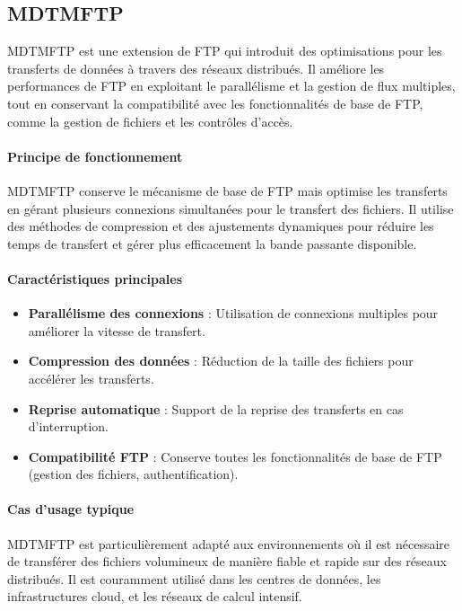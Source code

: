 \subsection{MDTMFTP}
MDTMFTP\cite{zhang2018mdtmftp, nadig2018comparative} est une extension de FTP qui introduit des optimisations pour les transferts de données à travers des réseaux distribués. Il améliore les performances de FTP en exploitant le parallélisme et la gestion de flux multiples, tout en conservant la compatibilité avec les fonctionnalités de base de FTP, comme la gestion de fichiers et les contrôles d'accès.

\paragraph{Principe de fonctionnement}
MDTMFTP conserve le mécanisme de base de FTP mais optimise les transferts en gérant plusieurs connexions simultanées pour le transfert des fichiers. Il utilise des méthodes de compression et des ajustements dynamiques pour réduire les temps de transfert et gérer plus efficacement la bande passante disponible.

\paragraph{Caractéristiques principales} \begin{itemize} \item \textbf{Parallélisme des connexions} : Utilisation de connexions multiples pour améliorer la vitesse de transfert. \item \textbf{Compression des données} : Réduction de la taille des fichiers pour accélérer les transferts. \item \textbf{Reprise automatique} : Support de la reprise des transferts en cas d’interruption. \item \textbf{Compatibilité FTP} : Conserve toutes les fonctionnalités de base de FTP (gestion des fichiers, authentification). \end{itemize}

\paragraph{Cas d'usage typique}
MDTMFTP est particulièrement adapté aux environnements où il est nécessaire de transférer des fichiers volumineux de manière fiable et rapide sur des réseaux distribués. Il est couramment utilisé dans les centres de données, les infrastructures cloud, et les réseaux de calcul intensif.



